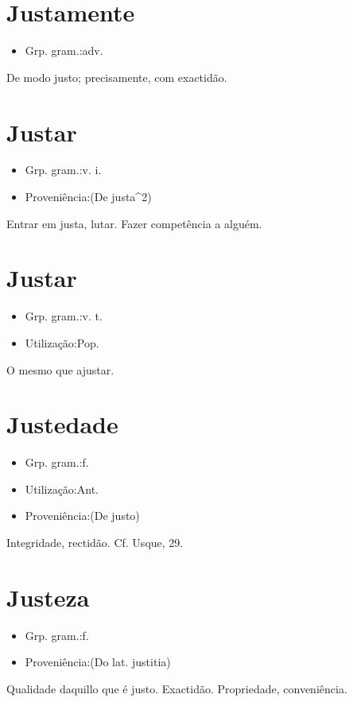 \documentclass{article}
\begin{document}
\section{Justamente}
\begin{itemize}
\item {Grp. gram.:adv.}
\end{itemize}
De modo justo; precisamente, com exactidão.
\section{Justar}
\begin{itemize}
\item {Grp. gram.:v. i.}
\end{itemize}
\begin{itemize}
\item {Proveniência:(De \textunderscore justa\textunderscore ^2)}
\end{itemize}
Entrar em justa, lutar.
Fazer competência a alguém.
\section{Justar}
\begin{itemize}
\item {Grp. gram.:v. t.}
\end{itemize}
\begin{itemize}
\item {Utilização:Pop.}
\end{itemize}
O mesmo que \textunderscore ajustar\textunderscore .
\section{Justedade}
\begin{itemize}
\item {Grp. gram.:f.}
\end{itemize}
\begin{itemize}
\item {Utilização:Ant.}
\end{itemize}
\begin{itemize}
\item {Proveniência:(De \textunderscore justo\textunderscore )}
\end{itemize}
Integridade, rectidão. Cf. Usque, 29.
\section{Justeza}
\begin{itemize}
\item {Grp. gram.:f.}
\end{itemize}
\begin{itemize}
\item {Proveniência:(Do lat. \textunderscore justitia\textunderscore )}
\end{itemize}
Qualidade daquillo que é justo.
Exactidão.
Propriedade, conveniência.
\end{document}

